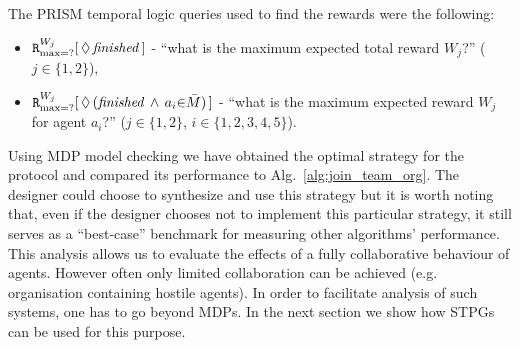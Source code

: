 \documentclass{llncs}
\begin{document}
The PRISM temporal logic queries used to find the rewards were the following:
\begin{itemize}
 \item ${\tt R}_{\max=?}^{W_{j}}[\,\Diamond\,\mathit{finished}\,]$ -
``what is the maximum expected total reward $W_j$?'' ($j\in\{1,2\}$),
 \item ${\tt R}_{\max=?}^{W_{j}}[\,\Diamond\,(\mathit{finished} \,\wedge\, a_i {\in} \bar{M}) \,]$ -
``what is the maximum expected reward $W_j$  for agent $a_i$?'' ($j\in\{1,2\}$, $i\in\{1,2,3,4,5\}$).
\end{itemize}
%
%
%

Using MDP model checking we have obtained the optimal strategy for the protocol and compared its performance to Alg.~\ref{alg:join_team_org}. The designer could choose to synthesize and use this strategy but it is worth noting that, even if the designer chooses not to implement this particular strategy, it still serves as a ``best-case'' benchmark for measuring other algorithms' performance. This analysis allows us to evaluate the effects of a fully collaborative behaviour of agents. However often only limited collaboration can be achieved (e.g. organisation containing hostile agents). In order to facilitate analysis of such systems, one has to go beyond MDPs. In the next section we show how STPGs can be used for this purpose.

\end{document}
